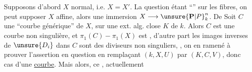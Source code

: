 Supposons d'abord $X$ normal, i.e. $X=X'$.
 La question étant
``'' sur les fibres,
on peut supposer $X$ affine, alors  une immersion
$X\longrightarrow\unsure{\mathbf P|P}_k^n$.
De 
Soit $C$ une ``courbe générique'' de $X$,
sur une ext. alg. close $K$ de $k$.
Alors $C$ est une courbe non singulière, et
$\pi_1(C)-\pi_1(X)$ est , d'autre part les images inverses
de $\unsure{D_i}$ dans $C$ sont des diviseurs non singuliers,
, on en 
ramené à prouver l'assertion en question en remplaçant $(k,X,U)$ par
$(K,C,V)$, donc cas d'une \uline{courbe}.
Mais alors, ce , actuellement

